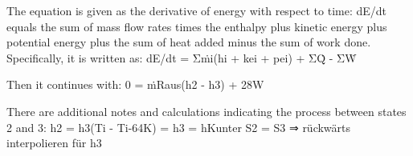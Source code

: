 The equation is given as the derivative of energy with respect to time: dE/dt equals the sum of mass flow rates times the enthalpy plus kinetic energy plus potential energy plus the sum of heat added minus the sum of work done. Specifically, it is written as:
dE/dt = Σṁi(hi + kei + pei) + ΣQ̇ - ΣẆ

Then it continues with:
0 = ṁRaus(h2 - h3) + 28W

There are additional notes and calculations indicating the process between states 2 and 3:
h2 = h3(Ti - Ti-64K) = 
h3 = hKunter
S2 = S3 ⇒ rückwärts interpolieren für h3